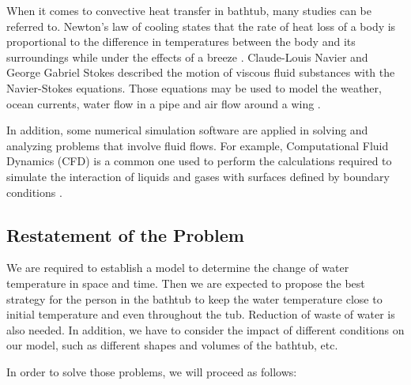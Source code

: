 \documentclass{mcmthesis}
\begin{document}
When it comes to convective heat transfer in bathtub, many studies can be referred to. Newton's law of cooling states that the rate of heat loss of a body is proportional to the difference in temperatures between the body and its surroundings while under the effects of a breeze . Claude-Louis Navier and George Gabriel Stokes described the motion of viscous fluid substances with the Navier-Stokes equations. Those equations may be used to model the weather, ocean currents, water flow in a pipe and air flow around a wing .

In addition, some numerical simulation software are applied in solving and analyzing problems that involve fluid flows. For example, Computational Fluid Dynamics (CFD) is a common one used to perform the calculations required to simulate the interaction of liquids and gases with surfaces defined by boundary conditions .

\subsection{Restatement of the Problem}

We are required to establish a model to determine the change of water temperature in space and time. Then we are expected to propose the best strategy for the person in the bathtub to keep the water temperature close to initial temperature and even throughout the tub. Reduction of waste of water is also needed. In addition, we have to consider the impact of different conditions on our model, such as different shapes and volumes of the bathtub, etc.

In order to solve those problems, we will proceed as follows:
\end{document}
